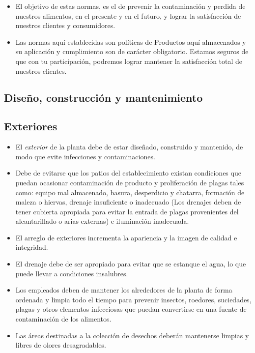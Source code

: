 \begin{itemize}
	\item El objetivo de estas normas, es el de prevenir la contaminación y perdida de nuestros alimentos, en el presente y en el futuro, y lograr la satisfacción de nuestros clientes y consumidores.
	\item Las normas aquí establecidas son políticas de Productos aquí almacenados y su aplicación y cumplimiento son de carácter obligatorio.
	      Estamos seguros de que con tu participación, podremos lograr mantener la satisfacción total de nuestros clientes.
\end{itemize}

\subsection{Diseño, construcción y mantenimiento}

\subsection{Exteriores}

\begin{itemize}
	\item El \emph{exterior} de la planta debe de estar diseñado, construido y mantenido, de modo que evite infecciones y contaminaciones.
	\item Debe de evitarse que los patios del establecimiento existan condiciones que puedan ocasionar contaminación de producto y proliferación de plagas tales como: equipo mal almacenado, basura, desperdicio y chatarra, formación de maleza o hiervas, drenaje insuficiente o inadecuado (Los drenajes deben de tener cubierta apropiada para evitar la entrada de plagas provenientes del alcantarillado o arias externas) e iluminación inadecuada.
	\item El arreglo de exteriores incrementa la apariencia y la imagen de calidad e integridad.
	\item El drenaje debe de ser apropiado para evitar que se estanque el agua, lo que puede llevar a condiciones insalubres.
	\item Los empleados deben de mantener los alrededores de la planta de forma ordenada y limpia todo el tiempo para prevenir insectos, roedores, suciedades, plagas y otros elementos infecciosas que puedan convertirse en una fuente de contaminación de los alimentos.
	\item Las áreas destinadas a la colección de desechos deberán mantenerse limpias y libres de olores desagradables.
\end{itemize}

